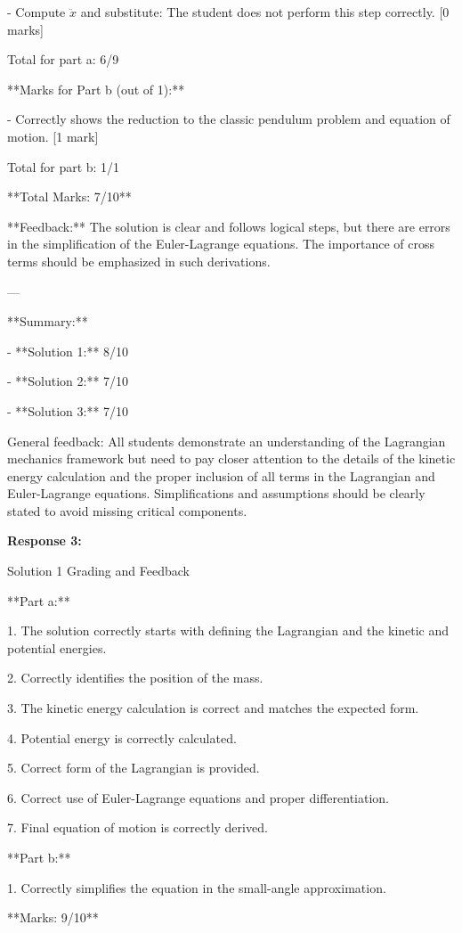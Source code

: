 \documentclass[a4paper,11pt]{article}
\begin{document}
- Compute \( \ddot{x} \) and substitute: The student does not perform this step correctly. [0 marks]

Total for part a: 6/9

**Marks for Part b (out of 1):**

- Correctly shows the reduction to the classic pendulum problem and equation of motion. [1 mark]

Total for part b: 1/1

**Total Marks: 7/10**

**Feedback:** The solution is clear and follows logical steps, but there are errors in the simplification of the Euler-Lagrange equations. The importance of cross terms should be emphasized in such derivations.

---

**Summary:**

- **Solution 1:** 8/10

- **Solution 2:** 7/10

- **Solution 3:** 7/10

General feedback: All students demonstrate an understanding of the Lagrangian mechanics framework but need to pay closer attention to the details of the kinetic energy calculation and the proper inclusion of all terms in the Lagrangian and Euler-Lagrange equations. Simplifications and assumptions should be clearly stated to avoid missing critical components.

\bigskip
\textbf{Response 3:}

Solution 1 Grading and Feedback

**Part a:**

1. The solution correctly starts with defining the Lagrangian and the kinetic and potential energies.

2. Correctly identifies the position of the mass.

3. The kinetic energy calculation is correct and matches the expected form.

4. Potential energy is correctly calculated.

5. Correct form of the Lagrangian is provided.

6. Correct use of Euler-Lagrange equations and proper differentiation.

7. Final equation of motion is correctly derived.

**Part b:**

1. Correctly simplifies the equation in the small-angle approximation.

**Marks: 9/10**
\end{document}
